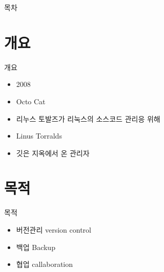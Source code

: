 \documentclass[aspectratio=1610,20pt,xcolor=pdftex,dvipsnames,table,handout]{beamer}
\begin{document}
\label{part1} 	%


		\begin{frame} [plain]{목차}
		\tableofcontents%
		\end{frame}


		

		\section{개요}


		\begin{frame} [t,plain]

			\begin{block} {개요}
			\setlength{\leftmargini}{2em}			
			\begin{itemize}
				\item 2008
				\item Octo Cat
				\item 리누스 토발즈가 리눅스의 소스코드 관리응 위해
				\item Linus Torralds
				\item 깃은 지옥에서 온 관리자
			\end{itemize}
			\end{block}						

		\end{frame}						


		\section{목적}

		\begin{frame} [t,plain]

			\begin{block} {목적}
			\setlength{\leftmargini}{2em}			
			\begin{itemize}
				\item 버전관리 version control
				\item 백업 Backup
				\item 협업 callaboration

			\end{itemize}
			\end{block}						

		\end{frame}			
\end{document}
